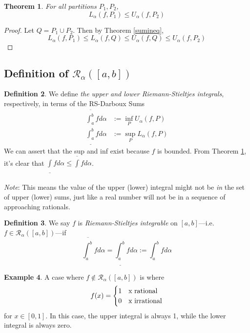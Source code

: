 \documentclass[12pt]{article}
\theoremstyle{plain}
\newtheorem{thm}{Theorem}[subsection]
\theoremstyle{definition}
\newtheorem{defn}[thm]{Definition}
\newtheorem{ex}[thm]{Example}
\theoremstyle{remark}
\begin{document}
\begin{thm} 
\label{pineq}
    For all partitions $P_1, P_2$, 
    \[ L_\alpha(f,P_1) \leq U_\alpha(f,P_2) \]
\end{thm}
\begin{proof} Let $Q = P_1 \cup P_2$. Then by Theorem \ref{sumineq}, 
    \[ L_\alpha(f,P_1) \leq L_\alpha(f,Q) \leq U_\alpha(f,Q) 
        \leq U_\alpha(f,P_2) \]
\end{proof}


\subsection{Definition of $\mathscr{R}_\alpha([a,b])$}


\begin{defn} We define \emph{the upper and lower Riemann-Stieltjes integrals}, respectively, in terms of the RS-Darboux Sums
    \begin{align*} 
        \overline{\int^b_a} f d\alpha &:= \inf_P U_\alpha(f,P) \\
        \underline{\int^b_a} f d\alpha &:= \sup_P L_\alpha(f,P)
    \end{align*}
We can assert that the sup and inf exist because $f$ is bounded. From Theorem \ref{pineq}, it's clear that $\underline{\int} f d\alpha \leq \overline{\int} f d\alpha$.
\\
\\
\emph{Note}: This means the value of the upper (lower) integral might not be \emph{in} the set of upper (lower) sums, just like a real number will not be in a sequence of approaching rationals. 
\end{defn}

\begin{defn} We say  $f$ is \emph{Riemann-Stieltjes integrable} on $[a,b]$---i.e. $f \in \mathscr{R}_\alpha([a,b])$---if 
    \[ \overline{\int^b_a} f d\alpha  =
        \underline{\int^b_a} f d\alpha 
        := {\int^b_a} f d\alpha
        \]
\end{defn}

\begin{ex} A case where $f \notin \mathscr{R}_\alpha([a,b])$ is where 
    \[ f(x) = \begin{cases} 1 & $x$\text{ rational} \\
            0 & $x$\text{ irrational} \end{cases}\]
for $x\in[0,1]$. In this case, the upper integral is always 1, while the lower integral is always zero.
\end{ex}
\end{document}
